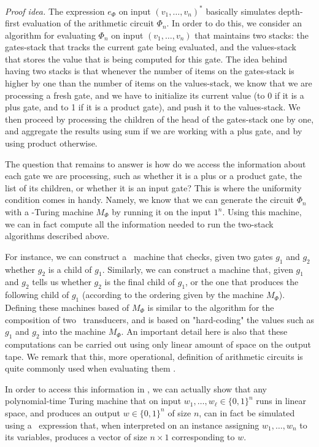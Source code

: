 {\em Proof idea.}
The expression $e_\Phi$ on input $(v_1,\ldots ,v_n)^*$ basically simulates depth-first evaluation of the arithmetic circuit $\Phi_n$. 
In order to do this, we consider an algorithm for evaluating $\Phi_n$ on input $(v_1,\ldots ,v_n)$ that maintains  two stacks: the gates-stack that tracks the current gate being evaluated, and the values-stack that stores the value that is being computed for this gate. The idea behind having two stacks is that whenever the number of items on the gates-stack is higher by one than the number of items on the values-stack, we know that we are processing a fresh gate, and we have to initialize its current value (to 0 if it is a plus gate, and to 1 if it is a product gate), and push it to the values-stack. We then proceed by processing the children of the head of the gates-stack one by one, and aggregate the results using sum if we are working with a plus gate, and by using product otherwise. 

The question that remains to answer is how do we access the information about each gate we are processing, such as whether it is a plus or a product gate, the list of its children, or whether it is an input gate? This is where the uniformity condition comes in handy. Namely, we know that we can generate the circuit $\Phi_n$ with a \logspace-Turing machine $M_\Phi$ by running it on the input $1^n$. Using this machine, we can in fact compute all the information needed to run the two-stack algorithms described above. 

For instance, we can construct a \logspace\ machine that checks, given two gates $g_1$ and $g_2$ whether $g_2$ is a child of $g_1$. Similarly, we can construct a machine that, given $g_1$ and $g_2$ tells us whether $g_2$ is the final child of $g_1$, or the one that produces the following child of $g_1$ (according to the ordering given by the machine $M_\Phi$). Defining these machines based of $M_\Phi$ is similar to the algorithm for the composition of two \logspace\ transducers, and is based on "hard-coding" the values such as $g_1$ and $g_2$ into the machine $M_\Phi$. An important detail here is also that these computations can be carried out using only linear amount of space on the output tape. We remark that this, more operational, definition of arithmetic circuits is quite commonly used when evaluating them \cite{allender}.

In order to access this information in \langfor, we can actually show that any polynomial-time Turing machine that on input $w_1,\ldots ,w_\ell\in \{0,1\}^n$ runs in linear space, and produces an output $w\in \{0,1\}^n$ of size $n$, can in fact be simulated using a \langfor\ expression that, when interpreted on an instance assigning $w_1,\ldots ,w_n$ to its variables, produces a vector of size $n\times 1$ corresponding to $w$.

